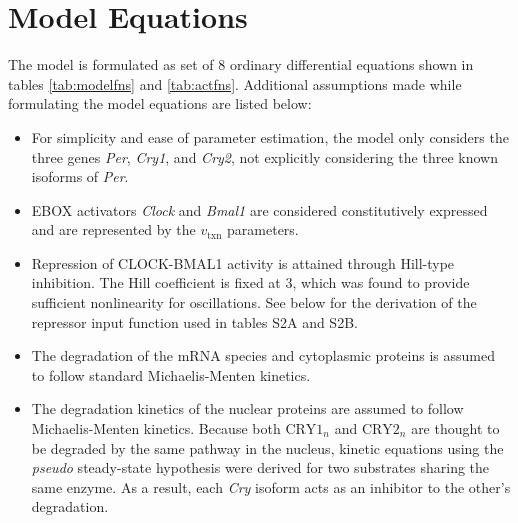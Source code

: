 \section{Model Equations}
The model is formulated as set of 8 ordinary differential equations shown in tables \ref{tab:modelfns} and \ref{tab:actfns}. Additional assumptions made while formulating the model equations are listed below:

\begin{itemize}

  \item For simplicity and  ease of parameter estimation, the model only considers the three genes {\it Per}, {\it Cry1}, and {\it Cry2}, not explicitly considering the three known isoforms of {\it Per}. 

  \item EBOX activators {\it Clock} and {\it Bmal1} are considered constitutively expressed and are represented by the $v_{\text{txn}}$ parameters. 

  \item Repression of CLOCK-BMAL1 activity is attained through Hill-type inhibition. The Hill coefficient is fixed at 3, which was found to provide sufficient nonlinearity for oscillations. See below for the derivation of the repressor input function used in tables S2A and S2B.

  \item The degradation of the mRNA species and cytoplasmic proteins is assumed to follow standard Michaelis-Menten kinetics.

  \item The degradation kinetics of the nuclear proteins are assumed to follow Michaelis-Menten kinetics. Because both $\text{CRY1}_n$ and $\text{CRY2}_n$ are thought to be degraded by the same pathway in the nucleus, kinetic equations using the {\it pseudo} steady-state hypothesis were derived for two substrates sharing the same enzyme. As a result, each {\it Cry} isoform acts as an inhibitor to the other's degradation.
\end{itemize}


